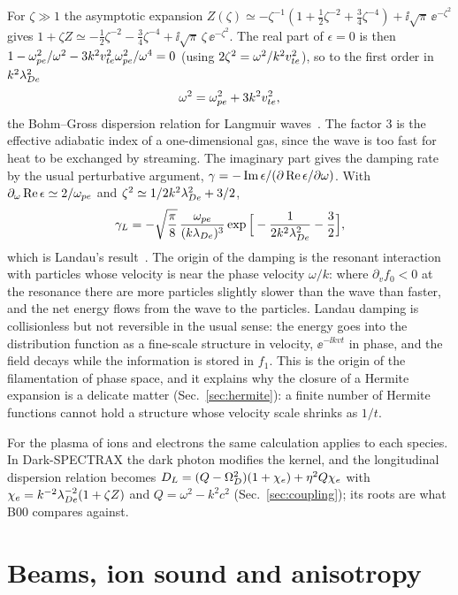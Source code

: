 For $\zeta\gg1$ the asymptotic expansion $Z(\zeta)\simeq-\zeta^{-1}(1+\tfrac12\zeta^{-2}+\tfrac34\zeta^{-4})+\ii\sqrt\pi\,\ee^{-\zeta^2}$ gives $1+\zeta Z\simeq-\tfrac12\zeta^{-2}-\tfrac34\zeta^{-4}+\ii\sqrt\pi\,\zeta\,\ee^{-\zeta^2}$. The real part of $\epsilon=0$ is then $1-\omega_{pe}^2/\omega^2-3k^2v_{te}^2\omega_{pe}^2/\omega^4=0$ (using $2\zeta^2=\omega^2/k^2v_{te}^2$), so to the first order in $k^2\lambda_{De}^2$
\begin{equation}
\omega^2=\omega_{pe}^2+3k^2v_{te}^2 ,\label{eq:BG}
\end{equation}
the Bohm--Gross dispersion relation for Langmuir waves~\citep{BohmGross1949}. The factor 3 is the effective adiabatic index of a one-dimensional gas, since the wave is too fast for heat to be exchanged by streaming. The imaginary part gives the damping rate by the usual perturbative argument, $\gamma=-\operatorname{Im}\epsilon/(\partial\operatorname{Re}\epsilon/\partial\omega)$. With $\partial_\omega\operatorname{Re}\epsilon\simeq2/\omega_{pe}$ and $\zeta^2\simeq1/2k^2\lambda_{De}^2+3/2$,
\begin{equation}
\gamma_L=-\sqrt{\frac\pi8}\,\frac{\omega_{pe}}{(k\lambda_{De})^3}\exp\Big[-\frac{1}{2k^2\lambda_{De}^2}-\frac32\Big] ,\label{eq:landau}
\end{equation}
which is Landau's result~\citep{Landau1946}. The origin of the damping is the resonant interaction with particles whose velocity is near the phase velocity $\omega/k$: where $\partial_vf_0<0$ at the resonance there are more particles slightly slower than the wave than faster, and the net energy flows from the wave to the particles. Landau damping is collisionless but not reversible in the usual sense: the energy goes into the distribution function as a fine-scale structure in velocity, $\ee^{-\ii kvt}$ in phase, and the field decays while the information is stored in $f_1$. This is the origin of the filamentation of phase space, and it explains why the closure of a Hermite expansion is a delicate matter (Sec.~\ref{sec:hermite}): a finite number of Hermite functions cannot hold a structure whose velocity scale shrinks as $1/t$.

For the plasma of ions and electrons the same calculation applies to each species. In Dark-SPECTRAX the dark photon modifies the kernel, and the longitudinal dispersion relation becomes $D_L=(Q-\Omega_D^2)(1+\chi_e)+\eta^2Q\chi_e$ with $\chi_e=k^{-2}\lambda_{De}^{-2}(1+\zeta Z)$ and $Q=\omega^2-k^2c^2$ (Sec.~\ref{sec:coupling}); its roots are what B00 compares against.

\section{Beams, ion sound and anisotropy}\label{sec:instab}

